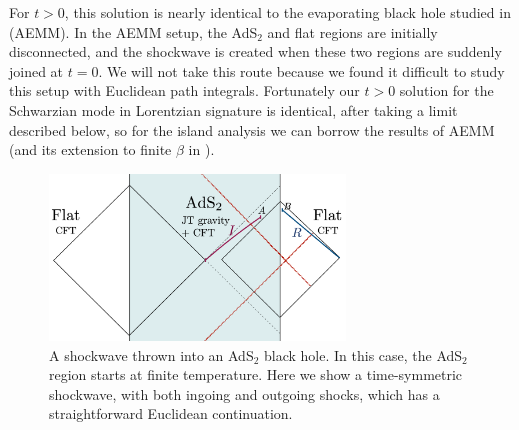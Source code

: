 \documentclass[12pt]{article}
\numberwithin{equation}{section}
\begin{document}
\begin{spacing}{1.1}
For $t>0$, this solution is nearly identical to the evaporating black hole studied in \cite{Almheiri:2019psf} (AEMM). In the AEMM setup, the AdS$_2$ and flat regions are initially disconnected, and the shockwave is created when these two regions are suddenly joined at $t=0$. We will not take this route because we found it difficult to study this setup with Euclidean path integrals.  Fortunately our $t>0$ solution for the Schwarzian mode in Lorentzian signature is identical, after taking a limit described below, so for the island analysis we can borrow the results of AEMM (and its extension to finite $\beta$ in \cite{Chen:2020jvn,Hollowood:2020kvk,Hollowood:2020cou  }).
\begin{figure}
      \begin{center}
 \includegraphics[width=0.7\textwidth]{figures/Island_evap.png}
  \caption{\small
  A shockwave thrown into an AdS$_2$ black hole. In this case, the AdS$_2$ region starts at finite temperature. Here we show a time-symmetric shockwave, with both ingoing and outgoing shocks, which has a straightforward Euclidean continuation.
  }
  \label{fig:setup-twosided2}
 \end{center}
 \end{figure}


\end{spacing}
\end{document}
